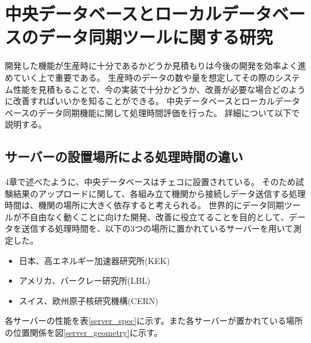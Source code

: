 \chapter{中央データベースとローカルデータベースのデータ同期ツールに関する研究}

開発した機能が生産時に十分であるかどうか見積もりは今後の開発を効率よく進めていく上で重要である。
生産時のデータの数や量を想定してその際のシステム性能を見積もることで、今の実装で十分かどうか、改善が必要な場合どのように改善すればいいかを知ることができる。
中央データベースとローカルデータベースのデータ同期機能に関して処理時間評価を行った。
詳細について以下で説明する。

\section{サーバーの設置場所による処理時間の違い}
4章で述べたように、中央データベースはチェコに設置されている。
そのため試験結果のアップロードに関して、各組み立て機関から接続しデータ送信する処理時間は、機関の場所に大きく依存すると考えられる。
世界的にデータ同期ツールが不自由なく動くことに向けた開発、改善に役立てることを目的として、データを送信する処理時間を、以下の3つの場所に置かれているサーバーを用いて測定した。

\begin{itemize}
  \item 日本、高エネルギー加速器研究所(KEK) 
  \item アメリカ、バークレー研究所(LBL)
  \item スイス、欧州原子核研究機構(CERN)
\end{itemize}

各サーバーの性能を表\ref{server_spec}に示す。また各サーバーが置かれている場所の位置関係を図\ref{server_geometry}に示す。

\begin{table}[tbp]
\caption[サーバーの性能一覧]{サーバーの性能一覧}
\label{server_spec}
\end{table}


